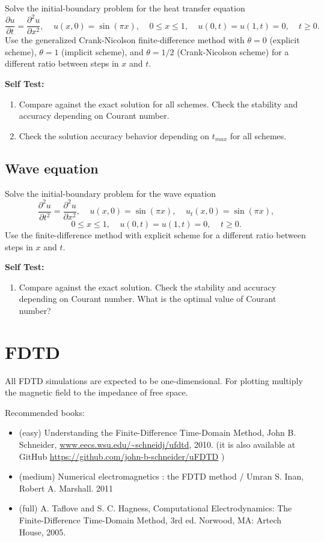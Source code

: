 \documentclass[11pt]{article}
\begin{document}
Solve the initial-boundary problem for the heat transfer equation
 $$ \frac{\partial u}{\partial t}=\frac{\partial^2u}{\partial
x^2},~~~~~ u(x,0)=\sin(\pi x),~~~~~0\le x\le 1,~~~~~
u(0,t)=u(1,t)=0,~~~~~t\ge 0.
 $$
 Use the generalized Crank-Nicolson finite-difference method with
 $\theta=0$ (explicit scheme), $\theta=1$ (implicit scheme), and
 $\theta=1/2$ (Crank-Nicolson scheme) for a different ratio between
 steps in $x$ and $t$.
 
 \textbf{Self Test:}
\begin{enumerate}
\item Compare against the exact solution for all schemes. Check the stability and accuracy depending on Courant number.
\item Check the solution accuracy behavior depending on $t_{max}$ for all schemes.
 \end{enumerate}


\subsection{Wave equation}
\label{sec:wave-equation}


Solve the initial-boundary problem for the wave  equation
 $$ \frac{\partial^2 u}{\partial t^2}=\frac{\partial^2u}{\partial
x^2},~~~~~ u(x,0)=\sin(\pi x),~~~~~u_t(x,0)=\sin(\pi x),
 $$
 $$
0\le
x\le 1,~~~~~ u(0,t)=u(1,t)=0,~~~~~t\ge 0.
 $$
 Use the finite-difference method with explicit
 scheme for a different ratio between steps in $x$ and $t$. 
 
 \textbf{Self Test:}
\begin{enumerate}
\item Compare against the exact solution. Check the stability and accuracy depending on Courant number. What is the optimal value of Courant number?
 \end{enumerate}


\section{FDTD}

All FDTD simulations are expected to be one-dimensional. For plotting multiply the magnetic field to the impedance of free space.

Recommended books:
\begin{itemize}
  \item (easy) Understanding the Finite-Difference Time-Domain Method,
	   John B. Schneider, \url{www.eecs.wsu.edu/~schneidj/ufdtd}, 2010. (it is
    also available at GitHub \url{https://github.com/john-b-schneider/uFDTD} )
  \item (medium) Numerical electromagnetics : the FDTD method / Umran
    S. Inan, Robert A. Marshall. 2011
  \item (full) A. Taflove and S. C. Hagness, Computational
    Electrodynamics: The Finite-Difference Time-Domain Method, 3rd
    ed. Norwood, MA: Artech House, 2005.
  \end{itemize}
\end{document}
